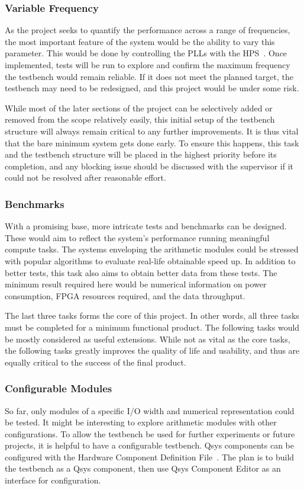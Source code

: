 \subsubsection{\textbf{Variable Frequency}}
As the project seeks to quantify the performance across a range of frequencies,
the most important feature of the system would be the ability to vary this
parameter.
This would be done by controlling the PLLs with the HPS~\cite{Altera4}.
Once implemented, tests will be run to explore and confirm the maximum
frequency the testbench would remain reliable.
If it does not meet the planned target, the testbench may need to be redesigned,
and this project would be under some risk.

While most of the later sections of the project can be selectively added or
removed from the scope relatively easily, this initial setup of the testbench
structure will always remain critical to any further improvements.
It is thus vital that the bare minimum system gets done early.
To ensure this happens, this task and the testbench structure will be placed in
the highest priority before its completion, and any blocking issue should be
discussed with the supervisor if it could not be resolved after reasonable
effort.

\subsubsection{\textbf{Benchmarks}}
With a promising base, more intricate tests and benchmarks can be designed.
These would aim to reflect the system's performance running meaningful compute
tasks.
The systems enveloping the arithmetic modules could be stressed with popular
algorithms to evaluate real-life obtainable speed up.
In addition to better tests, this task also aims to obtain better data from
these tests.
The minimum result required here would be numerical information on power
consumption, FPGA resources required, and the data throughput.

The last three tasks forms the core of this project.
In other words, all three tasks must be completed for a minimum functional
product.
The following tasks would be mostly considered as useful extensions.
While not as vital as the core tasks, the following tasks greatly improves the
quality of life and usability, and thus are equally critical to the success
of the final product.

\subsubsection{\textbf{Configurable Modules}}
So far, only modules of a specific I/O width and numerical representation
could be tested.
It might be interesting to explore arithmetic modules with other configurations.
To allow the testbench be used for further experiments or future projects,
it is helpful to have a configurable testbench.
Qsys components can be configured with the Hardware Component Definition
File~\cite{Altera5}.
The plan is to build the testbench as a Qsys component, then use Qsys Component
Editor as an interface for configuration.

